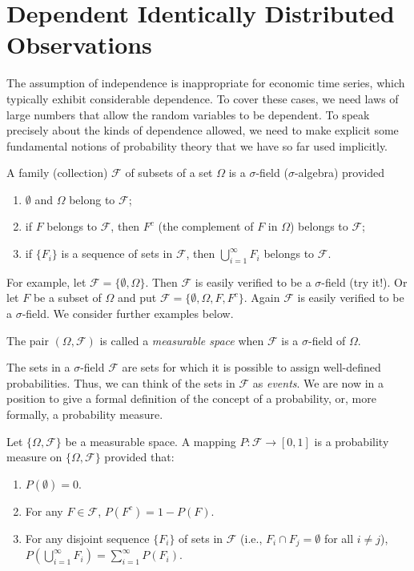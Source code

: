 \section{Dependent Identically Distributed Observations}\label{sec:lln-dep-id}

The assumption of independence is inappropriate for economic time series, which typically exhibit considerable dependence. To cover these cases, we need laws of large numbers that allow the random variables to be dependent. To speak precisely about the kinds of dependence allowed, we need to make explicit some fundamental notions of probability theory that we have so far used implicitly.

\begin{definition}\label{def:sigma-field}
A family (collection) $\mathcal{F}$ of subsets of a set $\Omega$ is a $\sigma$-field ($\sigma$-algebra) provided
\begin{enumerate}[label=(\roman*)]
\item $\emptyset$ and $\Omega$ belong to $\mathcal{F}$;
\item if $F$ belongs to $\mathcal{F}$, then $F^c$ (the complement of $F$ in $\Omega$) belongs to $\mathcal{F}$;
\item if $\{F_i\}$ is a sequence of sets in $\mathcal{F}$, then $\bigcup_{i=1}^{\infty} F_i$ belongs to $\mathcal{F}$.
\end{enumerate}
\end{definition}

For example, let $\mathcal{F} = \{\emptyset, \Omega\}$. Then $\mathcal{F}$ is easily verified to be a $\sigma$-field (try it!). Or let $F$ be a subset of $\Omega$ and put $\mathcal{F} = \{\emptyset, \Omega, F, F^c\}$. Again $\mathcal{F}$ is easily verified to be a $\sigma$-field. We consider further examples below.

The pair $(\Omega, \mathcal{F})$ is called a \emph{measurable space} when $\mathcal{F}$ is a $\sigma$-field of $\Omega$.

The sets in a $\sigma$-field $\mathcal{F}$ are sets for which it is possible to assign well-defined probabilities. Thus, we can think of the sets in $\mathcal{F}$ as \emph{events}. We are now in a position to give a formal definition of the concept of a probability, or, more formally, a probability measure.

\begin{definition}\label{def:prob-measure}
Let $\{\Omega, \mathcal{F}\}$ be a measurable space. A mapping $P : \mathcal{F} \to [0,1]$ is a probability measure on $\{\Omega, \mathcal{F}\}$ provided that:
\begin{enumerate}[label=(\roman*)]
\item $P(\emptyset) = 0$.
\item For any $F \in \mathcal{F}$, $P(F^c) = 1 - P(F)$.
\item For any disjoint sequence $\{F_i\}$ of sets in $\mathcal{F}$ (i.e., $F_i \cap F_j = \emptyset$ for all $i \neq j$), $P(\bigcup_{i=1}^{\infty} F_i) = \sum_{i=1}^{\infty} P(F_i)$.
\end{enumerate}
\end{definition}

